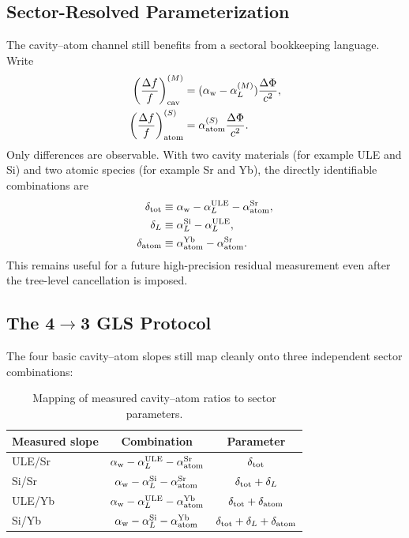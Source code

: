 \subsection{Sector-Resolved Parameterization}\label{sec:cavity-sectors}

The cavity--atom channel still benefits from a sectoral bookkeeping language.  Write
\begin{align}
\left(\frac{\Delta f}{f}\right)_{\rm cav}^{(M)} &= (\alpha_{\rm w}-\alpha_L^{(M)})\frac{\Delta\Phi}{c^2}, \\
\left(\frac{\Delta f}{f}\right)_{\rm atom}^{(S)} &= \alpha_{\rm atom}^{(S)}\frac{\Delta\Phi}{c^2}.
\end{align}
Only differences are observable.  With two cavity materials (for example ULE and Si) and two atomic species (for example Sr and Yb), the directly identifiable combinations are
\begin{align}
\delta_{\rm tot} &\equiv \alpha_{\rm w}-\alpha_L^{\rm ULE}-\alpha_{\rm atom}^{\rm Sr}, \\
\delta_L &\equiv \alpha_L^{\rm Si}-\alpha_L^{\rm ULE}, \\
\delta_{\rm atom} &\equiv \alpha_{\rm atom}^{\rm Yb}-\alpha_{\rm atom}^{\rm Sr}.
\end{align}
This remains useful for a future high-precision residual measurement even after the tree-level cancellation is imposed.

\subsection{The 4$\to$3 GLS Protocol}\label{sec:cavity-gls}

The four basic cavity--atom slopes still map cleanly onto three independent sector combinations:
\begin{table}[h]
\centering
\caption{Mapping of measured cavity--atom ratios to sector parameters.}
\label{tab:gls-mapping}
\begin{ruledtabular}
\begin{tabular}{lcc}
Measured slope & Combination & Parameter \\
\hline
ULE/Sr & $\alpha_{\rm w}-\alpha_L^{\rm ULE}-\alpha_{\rm atom}^{\rm Sr}$ & $\delta_{\rm tot}$ \\
Si/Sr & $\alpha_{\rm w}-\alpha_L^{\rm Si}-\alpha_{\rm atom}^{\rm Sr}$ & $\delta_{\rm tot}+\delta_L$ \\
ULE/Yb & $\alpha_{\rm w}-\alpha_L^{\rm ULE}-\alpha_{\rm atom}^{\rm Yb}$ & $\delta_{\rm tot}+\delta_{\rm atom}$ \\
Si/Yb & $\alpha_{\rm w}-\alpha_L^{\rm Si}-\alpha_{\rm atom}^{\rm Yb}$ & $\delta_{\rm tot}+\delta_L+\delta_{\rm atom}$ \\
\end{tabular}
\end{ruledtabular}
\end{table}

